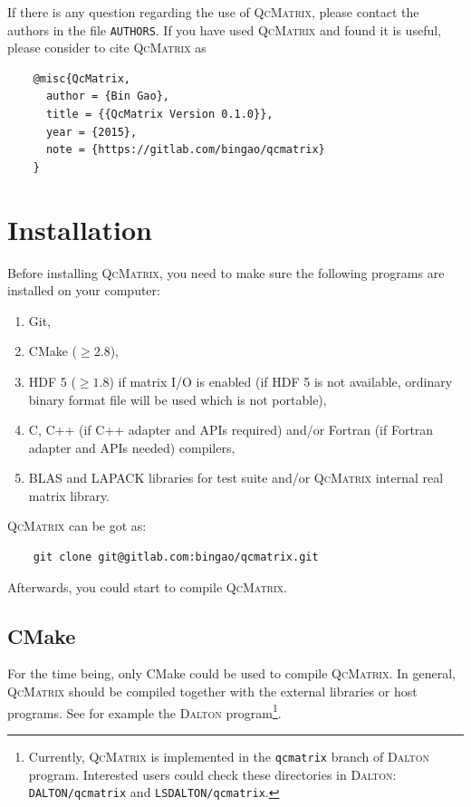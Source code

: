 \documentclass[a4paper,11pt,twoside,openright]{book}
\begin{document}
If there is any question regarding the use of \textsc{QcMatrix}, please contact the authors
in the file \verb|AUTHORS|. If you have used \textsc{QcMatrix} and found it is useful, please
consider to cite \textsc{QcMatrix} as
\begin{verbatim}
    @misc{QcMatrix,
      author = {Bin Gao},
      title = {{QcMatrix Version 0.1.0}},
      year = {2015},
      note = {https://gitlab.com/bingao/qcmatrix}
    }
\end{verbatim}

\chapter{Installation}
\label{chapter-installation}

Before installing \textsc{QcMatrix}, you need to make sure the following programs are
installed on your computer:
\begin{enumerate}
  \item Git,
  \item CMake ($\ge2.8$),
  \item HDF 5 ($\ge1.8$) if matrix I/O is enabled (if HDF 5 is not available, ordinary
    binary format file will be used which is not portable),
  \item C, C++ (if C++ adapter and APIs required) and/or Fortran (if Fortran adapter
    and APIs needed) compilers,
  \item BLAS and LAPACK libraries for test suite and/or \textsc{QcMatrix} internal real
    matrix library.
\end{enumerate}

\textsc{QcMatrix} can be got as:
\begin{verbatim}
    git clone git@gitlab.com:bingao/qcmatrix.git
\end{verbatim}
Afterwards, you could start to compile \textsc{QcMatrix}.

\section{CMake}
\label{section-install-cmake}

For the time being, only CMake could be used to compile \textsc{QcMatrix}. In general,
\textsc{QcMatrix} should be compiled together with the external libraries or host
programs. See for example the \textsc{Dalton} program\footnote{Currently,
\textsc{QcMatrix} is implemented in the \texttt{qcmatrix} branch of \textsc{Dalton}
program. Interested users could check these directories in \textsc{Dalton}:
\texttt{DALTON/qcmatrix} and \texttt{LSDALTON/qcmatrix}.}.
\end{document}
